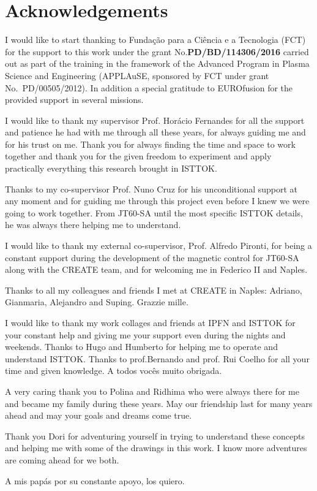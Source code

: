 \chapter*{Acknowledgements}

I would like to start thanking to Funda\c{c}\~{a}o para a Ci\^{e}ncia e a Tecnologia (FCT) for the support to this work under the grant No.\textbf{PD/BD/114306/2016} carried out as part of the training in the framework of the Advanced Program in Plasma Science and Engineering (APPLAuSE, sponsored by FCT under grant No.~PD/00505/2012). In addition a special gratitude to EUROfusion for the provided support in several missions. 
\smallskip

I would like to thank my supervisor Prof. Horácio Fernandes for all the support and patience he had with me through all these years, for always guiding me and for his trust on me. Thank you for always finding the time and space to work together and thank you for the given freedom to experiment and apply practically everything this research brought in ISTTOK.
\smallskip

Thanks to my co-supervisor Prof. Nuno Cruz for his unconditional support at any moment and for guiding me through this project even before I knew we were going to work together. From JT60-SA until the most specific ISTTOK details, he was always there helping me to understand.
\smallskip

I would like to thank my external co-supervisor, Prof. Alfredo Pironti, for being a constant support during the development of the magnetic control for JT60-SA along with the CREATE team, and for welcoming me in Federico II and Naples. \smallskip

Thanks to all my colleagues and friends I met at CREATE in Naples: Adriano, Gianmaria, Alejandro and Suping. Grazzie mille.\smallskip

I would like to thank my work collages and friends at IPFN and ISTTOK for your constant help and giving me your support even during the nights and weekends. Thanks to Hugo and Humberto for helping me to operate and understand ISTTOK. Thanks to prof.Bernando and prof. Rui Coelho for all your time and given knowledge. A todos vocês muito obrigada.\smallskip


A very caring thank you to Polina and Ridhima who were always there for me and became my family during these years. May our friendship last for many years ahead and may your goals and dreams come true.\smallskip

Thank you Dori for adventuring yourself in trying to understand these concepts and helping me with some of the drawings in this work. I know more adventures are coming ahead for we both.\smallskip

A mis papás por su constante apoyo, los quiero.   

 





